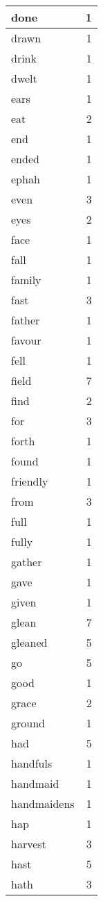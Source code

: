 \begin{center}
\begin{longtable}{l|r}
done & 1 \\ \hline
drawn & 1 \\ \hline
drink & 1 \\ \hline
dwelt & 1 \\ \hline
ears & 1 \\ \hline
eat & 2 \\ \hline
end & 1 \\ \hline
ended & 1 \\ \hline
ephah & 1 \\ \hline
even & 3 \\ \hline
eyes & 2 \\ \hline
face & 1 \\ \hline
fall & 1 \\ \hline
family & 1 \\ \hline
fast & 3 \\ \hline
father & 1 \\ \hline
favour & 1 \\ \hline
fell & 1 \\ \hline
field & 7 \\ \hline
find & 2 \\ \hline
for & 3 \\ \hline
forth & 1 \\ \hline
found & 1 \\ \hline
friendly & 1 \\ \hline
from & 3 \\ \hline
full & 1 \\ \hline
fully & 1 \\ \hline
gather & 1 \\ \hline
gave & 1 \\ \hline
given & 1 \\ \hline
glean & 7 \\ \hline
gleaned & 5 \\ \hline
go & 5 \\ \hline
good & 1 \\ \hline
grace & 2 \\ \hline
ground & 1 \\ \hline
had & 5 \\ \hline
handfuls & 1 \\ \hline
handmaid & 1 \\ \hline
handmaidens & 1 \\ \hline
hap & 1 \\ \hline
harvest & 3 \\ \hline
hast & 5 \\ \hline
hath & 3 \\ \hline

\end{longtable}
\end{center}
